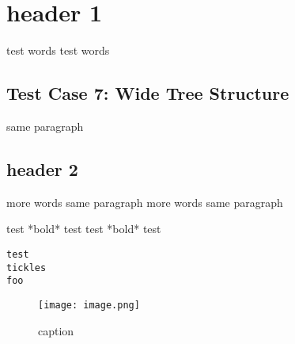 \documentclass{article}
\begin{document}
\section{header 1}
test words test words

\subsection{Test Case 7: Wide Tree Structure}
same paragraph
\subsection{header 2}
more words same paragraph more words same paragraph

test *bold* test test *bold* test


\begin{verbatim}
test
tickles
foo
\end{verbatim}
\begin{figure}[h]\centering\texttt{[image: image.png]}\caption{caption}\end{figure}
\end{document}
